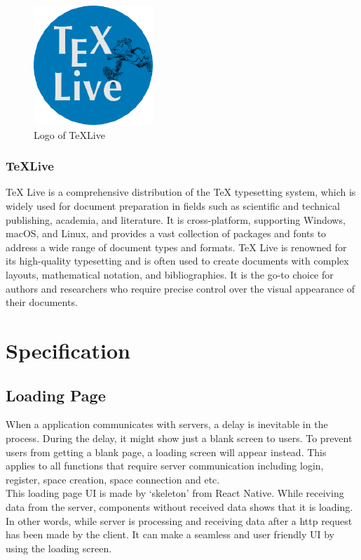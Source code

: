 \documentclass[conference]{IEEEtran}
\begin{document}
        \begin{figure}[htbp]
        \centerline{\includegraphics[width=4.5cm]{Images/logo/texlive.png}}
        \label{fig}
        \caption{Logo of TeXLive}
        \end{figure}
        \subsubsection{TeXLive}
        TeX Live is a comprehensive distribution of the TeX typesetting system, which is widely used for document preparation in fields such as scientific and technical publishing, academia, and literature. It is cross-platform, supporting Windows, macOS, and Linux, and provides a vast collection of packages and fonts to address a wide range of document types and formats. TeX Live is renowned for its high-quality typesetting and is often used to create documents with complex layouts, mathematical notation, and bibliographies. It is the go-to choice for authors and researchers who require precise control over the visual appearance of their documents.\\
        
\section{Specification}
    \subsection{Loading Page}
        When a application communicates with servers, a delay is inevitable in the process. During the delay, it might show just a blank screen to users. To prevent users from getting a blank page, a loading screen will appear instead. This applies to all functions that require server communication including login, register, space creation, space connection and etc. \\
        This loading page UI is made by ‘skeleton’ from React Native. While receiving data from the server, components without received data shows that it is loading. In other words, while server is processing and receiving data after a http request has been made by the client. It can make a seamless and user friendly UI by using the loading screen.
\end{document}
